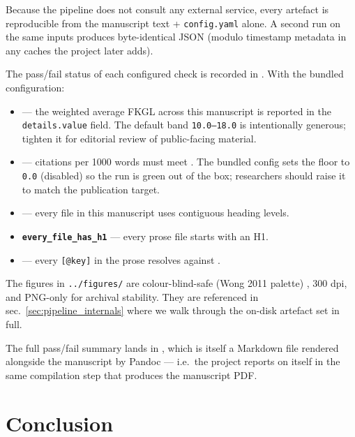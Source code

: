 \documentclass[
]{article}
\providecommand{\tightlist}{%
  \setlength{\itemsep}{0pt}\setlength{\parskip}{0pt}}
\begin{document}
Because the pipeline does not consult any external service, every
artefact is reproducible from the manuscript text + \texttt{config.yaml}
alone. A second run on the same inputs produces byte-identical JSON
(modulo timestamp metadata in any caches the project later adds).

The pass/fail status of each configured check is recorded in
. With the bundled configuration:

\begin{itemize}
\tightlist
\item
  \textbf{} --- the weighted average FKGL
  across this manuscript is reported in the 
  \texttt{details.value} field. The default band \texttt{10.0–18.0} is
  intentionally generous; tighten it for editorial review of
  public-facing material.
\item
  \textbf{} --- citations per
  1000 words must meet .
  The bundled config sets the floor to \texttt{0.0} (disabled) so the
  run is green out of the box; researchers should raise it to match the
  publication target.
\item
  \textbf{} --- every file in this
  manuscript uses contiguous heading levels.
\item
  \textbf{\texttt{every\_file\_has\_h1}} --- every prose file starts
  with an H1.
\item
  \textbf{} --- every
  \texttt{{[}@key{]}} in the prose resolves against
  .
\end{itemize}

The figures in \texttt{../figures/} are colour-blind-safe (Wong 2011
palette) \citep{wong2011points}, 300 dpi, and PNG-only for archival
stability. They are referenced in sec.~\ref{sec:pipeline_internals}
where we walk through the on-disk artefact set in full.

The full pass/fail summary lands in ,
which is itself a Markdown file rendered alongside the manuscript by
Pandoc --- i.e.~the project reports on itself in the same compilation
step that produces the manuscript PDF.

\newpage

\section{Conclusion}\label{sec:conclusion}
\end{document}
